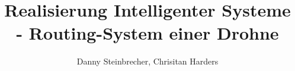 \title{Realisierung Intelligenter Systeme - Routing-System einer Drohne}

\author{Danny Steinbrecher, Chrisitan Harders}

\maketitle
